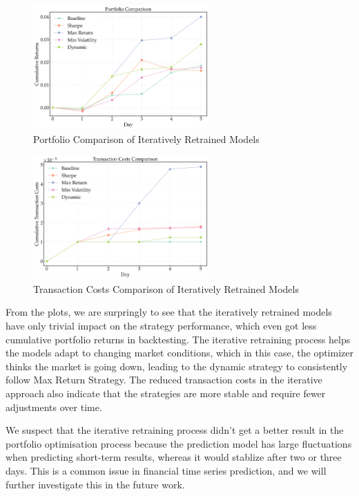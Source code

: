 \begin{figure}[htbp]
    \centering
    \includegraphics[width=0.6\textwidth]{figures/portfolio_comparison_final.png}
    \caption{Portfolio Comparison of Iteratively Retrained Models}
    \label{fig:portfolio_comparison_iterative}
\end{figure}


\begin{figure}[htbp]
    \centering
    \includegraphics[width=0.6\textwidth]{figures/trx_costs_comparison_final.png}
    \caption{Transaction Costs Comparison of Iteratively Retrained Models}
    \label{fig:trx_costs_comparison_iterative}
\end{figure}

From the plots, we are surpringly to see that the iteratively retrained models have only trivial impact on the strategy performance, which even got less cumulative portfolio returns in backtesting. The iterative retraining process helps the models adapt to changing market conditions, which in this case, the optimizer thinks the market is going down, leading to the dynamic strategy to consistently follow Max Return Strategy. The reduced transaction costs in the iterative approach also indicate that the strategies are more stable and require fewer adjustments over time.

We suspect that the iterative retraining process didn't get a better result in the portfolio optimisation process because the prediction model has large fluctuations when predicting short-term results, whereas it would stablize after two or three days. This is a common issue in financial time series prediction, and we will further investigate this in the future work.



